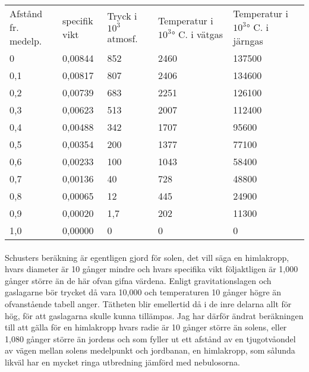 \documentclass[a4paper, 12pt, oneside, swedish]{article}
\begin{document}
\begin{table}[H]
    \centering
    \footnotesize
    \begin{tabular}{p{15mm} p{15mm} p{15mm} p{21mm} p{23mm}}
        Afstånd fr. medelp. & specifik vikt & Tryck i $10^{3}$ atmosf. & Temperatur i $10^{3}$° C. i vätgas & Temperatur i $10^{3}$° C. i järngas \\
        0 & 0,00844 & 852 & 2460 & 137500 \\
        0,1 & 0,00817 & 807 & 2406 & 134600 \\
        0,2 & 0,00739 & 683 & 2251 & 126100 \\ 
        0,3 & 0,00623 & 513 & 2007 & 112400 \\
        0,4 & 0,00488 & 342 & 1707 & 95600 \\
        0,5 & 0,00354 & 200 & 1377 & 77100 \\
        0,6 & 0,00233 & 100 & 1043 & 58400 \\
        0,7 & 0,00136 & 40 & 728 & 48800 \\
        0,8 & 0,00065 & 12 & 445 & 24900 \\
        0,9 & 0,00020 & 1,7 & 202 & 11300 \\
        1,0 & 0,00000 & 0 & 0 & 0 \\
    \end{tabular}
\end{table}
\paragraph{}
Schusters beräkning är egentligen gjord för solen, det vill säga en himlakropp, hvars diameter är 10 gånger mindre och hvars specifika vikt följaktligen är 1,000 gånger större än de här ofvan gifna värdena. Enligt gravitationslagen och gaslagarne bör trycket då vara 10,000 och temperaturen 10 gånger högre än ofvanstående tabell anger. Tätheten blir emellertid då i de inre delarna allt för hög, för att gaslagarna skulle kunna tillämpas. Jag har därför ändrat beräkningen till att gälla för en himlakropp hvars radie är 10 gånger större än solens, eller 1,080 gånger större än jordens och som fyller ut ett afstånd av en tjugotvåondel av vägen mellan solens medelpunkt och jordbanan, en himlakropp, som sålunda likväl har en mycket ringa utbredning jämförd med nebulosorna.
\end{document}
